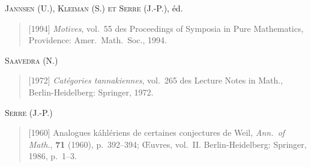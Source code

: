\documentclass[11pt,a4paper]{article}
\theoremstyle{plain}
\theoremstyle{definition}
\begin{document}
\medskip
\noindent\textsc{Jannsen (U.), Kleiman (S.) et Serre (J.-P.)}, \'ed.
\begin{quote}
[1994] \emph{Motives}, vol.~55 des Proceedings of Symposia in Pure Mathematics, Providence: Amer.\ Math.\ Soc., 1994.
\end{quote}

\medskip
\noindent\textsc{Saavedra (N.)}
\begin{quote}
[1972] \emph{Cat\'egories tannakiennes}, vol.~265 des Lecture Notes in Math., Berlin-Heidelberg: Springer, 1972.
\end{quote}

\medskip
\noindent\textsc{Serre (J.-P.)}
\begin{quote}
[1960] Analogues k\'ahl\'eriens de certaines conjectures de Weil, \emph{Ann.\ of Math.}, \textbf{71} (1960), p.~392--394; \OE uvres, vol.~II. Berlin-Heidelberg: Springer, 1986, p.~1--3.
\end{quote}
\end{document}
